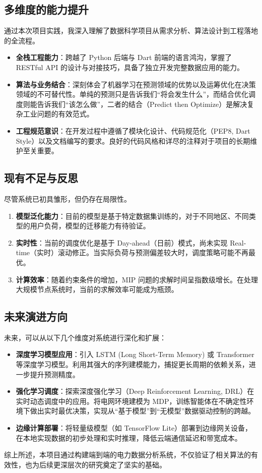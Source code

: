 \subsection{多维度的能力提升}
通过本次项目实践，我深入理解了数据科学项目从需求分析、算法设计到工程落地的全流程。
\begin{itemize}
    \item \textbf{全栈工程能力}：跨越了 Python 后端与 Dart 前端的语言鸿沟，掌握了 RESTful API 的设计与对接技巧，具备了独立开发完整数据应用的能力。
    \item \textbf{算法与业务结合}：深刻体会了机器学习在预测领域的优势以及运筹优化在决策领域的不可替代性。单纯的预测只是告诉我们“将会发生什么”，而结合优化调度则能告诉我们“该怎么做”，二者的结合（Predict then Optimize）是解决复杂工业问题的有效范式。
    \item \textbf{工程规范意识}：在开发过程中遵循了模块化设计、代码规范化（PEP8, Dart Style）以及文档编写的要求。良好的代码风格和详尽的注释对于项目的长期维护至关重要。
\end{itemize}

\subsection{现有不足与反思}
尽管系统已初具雏形，但仍存在局限性。
\begin{enumerate}
    \item \textbf{模型泛化能力}：目前的模型是基于特定数据集训练的，对于不同地区、不同类型的用户负荷，模型的迁移能力有待验证。
    \item \textbf{实时性}：当前的调度优化是基于 Day-ahead（日前）模式，尚未实现 Real-time（实时）滚动修正。当实际负荷与预测偏差较大时，调度策略可能不再最优。
    \item \textbf{计算效率}：随着约束条件的增加，MIP 问题的求解时间呈指数级增长。在处理大规模节点系统时，当前的求解效率可能成为瓶颈。
\end{enumerate}

\subsection{未来演进方向}
未来，可以从以下几个维度对系统进行深化和扩展：
\begin{itemize}
    \item \textbf{深度学习模型应用}：引入 LSTM (Long Short-Term Memory) 或 Transformer 等深度学习模型。利用其强大的序列建模能力，捕捉更长周期的依赖关系，进一步提升预测精度。
    \item \textbf{强化学习调度}：探索深度强化学习（Deep Reinforcement Learning, DRL）在实时动态调度中的应用。将电网环境建模为 MDP，训练智能体在不确定性环境下做出实时最优决策，实现从“基于模型”到“无模型”数据驱动控制的跨越。
    \item \textbf{边缘计算部署}：将轻量级模型（如 TensorFlow Lite）部署到边缘网关设备，在本地实现数据的初步处理和实时推理，降低云端通信延迟和带宽成本。
\end{itemize}

综上所述，本项目通过构建端到端的电力数据分析系统，不仅验证了相关算法的有效性，也为后续更深层次的研究奠定了坚实的基础。